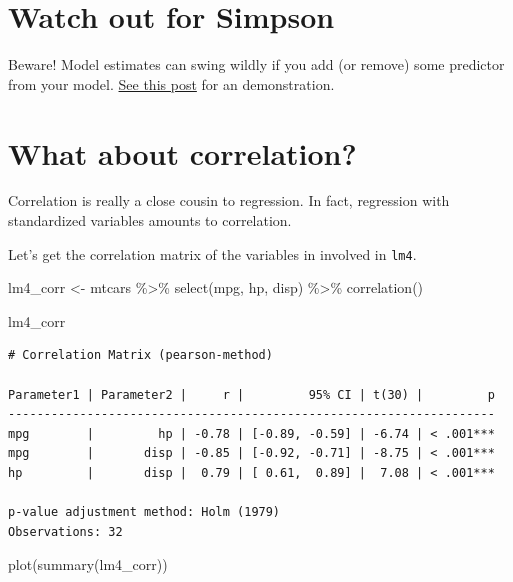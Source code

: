 \documentclass[
  letterpaper,
  DIV=11,
  numbers=noendperiod]{scrreprt}
\newenvironment{Shaded}{\begin{snugshade}}{\end{snugshade}}
\newcommand{\FunctionTok}[1]{\textcolor[rgb]{0.28,0.35,0.67}{#1}}
\newcommand{\NormalTok}[1]{\textcolor[rgb]{0.00,0.23,0.31}{#1}}
\newcommand{\OtherTok}[1]{\textcolor[rgb]{0.00,0.23,0.31}{#1}}
\newcommand{\SpecialCharTok}[1]{\textcolor[rgb]{0.37,0.37,0.37}{#1}}
\theoremstyle{definition}
\theoremstyle{definition}
\theoremstyle{remark}
\begin{document}
\hypertarget{watch-out-for-simpson}{%
\section{Watch out for Simpson}\label{watch-out-for-simpson}}

Beware! Model estimates can swing wildly if you add (or remove) some
predictor from your model.
\href{https://ecologyforthemasses.com/2022/06/08/who-is-simpson-and-what-does-his-paradox-mean-for-ecologists/}{See
this post} for an demonstration.

\hypertarget{what-about-correlation}{%
\section{What about correlation?}\label{what-about-correlation}}

Correlation is really a close cousin to regression. In fact, regression
with standardized variables amounts to correlation.

Let's get the correlation matrix of the variables in involved in
\texttt{lm4}.

\begin{Shaded}
\begin{Highlighting}[]
\NormalTok{lm4\_corr }\OtherTok{\textless{}{-}} 
\NormalTok{  mtcars }\SpecialCharTok{\%\textgreater{}\%} 
  \FunctionTok{select}\NormalTok{(mpg, hp, disp) }\SpecialCharTok{\%\textgreater{}\%} 
  \FunctionTok{correlation}\NormalTok{()}

\NormalTok{lm4\_corr}
\end{Highlighting}
\end{Shaded}

\begin{verbatim}
# Correlation Matrix (pearson-method)

Parameter1 | Parameter2 |     r |         95% CI | t(30) |         p
--------------------------------------------------------------------
mpg        |         hp | -0.78 | [-0.89, -0.59] | -6.74 | < .001***
mpg        |       disp | -0.85 | [-0.92, -0.71] | -8.75 | < .001***
hp         |       disp |  0.79 | [ 0.61,  0.89] |  7.08 | < .001***

p-value adjustment method: Holm (1979)
Observations: 32
\end{verbatim}

\begin{Shaded}
\begin{Highlighting}[]
\FunctionTok{plot}\NormalTok{(}\FunctionTok{summary}\NormalTok{(lm4\_corr))}
\end{Highlighting}
\end{Shaded}
\end{document}
